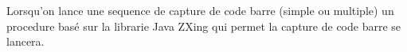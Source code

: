 \begin{figure}[htbp]
  \begin{center}
    \leavevmode
    \hspace{4cm}
  \end{center}
\end{figure}

Lorsqu'on lance une sequence de capture de code barre (simple ou multiple) un procedure basé sur la librarie Java ZXing qui permet la capture de code barre se lancera.
\newpage{}


